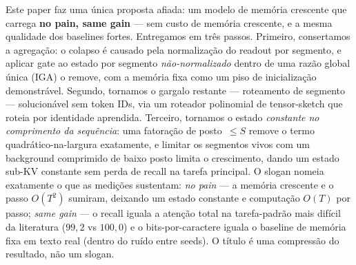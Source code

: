 \documentclass[11pt]{article}
\begin{document}
Este paper faz uma \'unica proposta afiada: um modelo de mem\'oria crescente que
carrega \textbf{no pain, same gain} --- sem custo de mem\'oria crescente, e a
mesma qualidade dos baselines fortes. Entregamos em tr\^es passos. Primeiro,
consertamos a agrega\c{c}\~ao: o colapso \'e causado pela normaliza\c{c}\~ao do
readout por segmento, e aplicar gate ao estado por segmento \emph{n\~ao-normalizado}
dentro de uma raz\~ao global \'unica (IGA) o remove, com a mem\'oria fixa como um
piso de inicializa\c{c}\~ao demonstr\'avel. Segundo, tornamos o gargalo restante
--- roteamento de segmento --- solucion\'avel sem token IDs, via um roteador
polinomial de tensor-sketch que roteia por identidade aprendida. Terceiro,
tornamos o estado \emph{constante no comprimento da sequ\^encia}: uma
fatora\c{c}\~ao de posto~$\le S$ remove o termo quadr\'atico-na-largura exatamente,
e limitar os segmentos vivos com um background comprimido de baixo posto limita o
crescimento, dando um estado sub-KV constante sem perda de recall na tarefa
principal. O slogan nomeia exatamente o que as medi\c{c}\~oes sustentam:
\emph{no pain} --- a mem\'oria crescente e o passo $O(T^2)$ sumiram, deixando um
estado constante e computa\c{c}\~ao $O(T)$ por passo; \emph{same gain} --- o recall
iguala a aten\c{c}\~ao total na tarefa-padr\~ao mais dif\'icil da literatura
($99{,}2$ vs $100{,}0$) e o bits-por-caractere iguala o baseline de mem\'oria fixa
em texto real (dentro do ru\'ido entre seeds). O t\'itulo \'e uma compress\~ao do
resultado, n\~ao um slogan.
\end{document}
